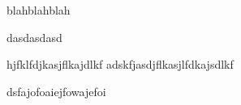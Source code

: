 \documentclass[12pt]{article}
\begin{document}
blahblahblah

dasdasdasd

hjfklfdjkasjflkajdlkf
adskfjasdjflkasjlfdkajsdlkf



dsfajofoaiejfowajefoi
\end{document}
